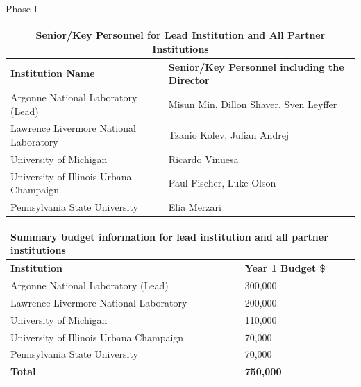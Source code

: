 \bigskip{} Phase I

\bigskip
\noindent
\begin{tabular}{|p{2.8in}|p{3.2in}|}\hline
\multicolumn{2}{|c|}{{\bf Senior/Key Personnel for Lead Institution and All Partner Institutions}} \\ \hline
{\bf Institution Name} & {\bf Senior/Key Personnel including the Director} \\ \hline
 Argonne National Laboratory (Lead)      & Misun Min, Dillon Shaver, Sven Leyffer   \\ \hline
 Lawrence Livermore National Laboratory  & Tzanio Kolev, Julian Andrej \\ \hline
 University of Michigan                  & Ricardo Vinuesa\\ \hline
 University of Illinois Urbana Champaign & Paul Fischer, Luke Olson\\ \hline
 Pennsylvania State University           & Elia Merzari\\ \hline
\end{tabular}


\bigskip
\noindent
\begin{tabular}{|p{2.8in}|p{3.2in}|}\hline
\multicolumn{2}{|p{6.0in}|}{{\bf Summary budget information for lead institution and all partner institutions}} \\ \hline
{\bf Institution}  & {\bf Year 1 Budget \$} \\ \hline
Argonne National Laboratory (Lead)      &  300,000      \\ \hline
Lawrence Livermore National Laboratory  &  200,000      \\ \hline
University of Michigan                  &  110,000      \\ \hline
University of Illinois Urbana Champaign & \hspace{.04in}  70,000      \\ \hline
Pennsylvania State University           & \hspace{.04in}  70,000      \\ \hline
{\bf Total}                             & {\bf 750,000} \\ \hline
\end{tabular}
